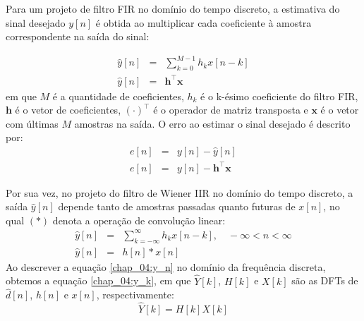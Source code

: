 Para um projeto de filtro FIR no domínio do tempo discreto, a estimativa do
sinal desejado $y[n]$ é obtida ao multiplicar cada coeficiente à amostra correspondente
na saída do sinal: 

\begin{eqnarray}
    \hat{y}[n] &=& \sum_{k=0}^{M-1}h_k x[n-k]\\
    \hat{y}[n] &=& \textbf{h}^\top \textbf{x}
    \end{eqnarray}
em que $M$ é a quantidade de coeficientes, $h_k$ é o k-ésimo coeficiente do
filtro FIR, $\textbf{h}$ é o vetor de coeficientes, $(\cdot) ^\top$ é o operador
de matriz transposta e $\mathbf{x}$ é o vetor com últimas $M$ amostras na saída.
O erro ao estimar o sinal desejado é descrito por:
\begin{eqnarray}
  \label{chap_04:error}  e[n] &=& y[n] - \hat{y}[n]\\
    e[n] &=& y[n] - \textbf{h}^\top \textbf{x}
\end{eqnarray}


Por sua vez, no projeto do filtro de Wiener IIR no domínio do tempo discreto, a
saída $\hat{y}[n]$ depende tanto de amostras passadas quanto futuras de $x[n]$,
no qual $(*)$ denota a operação de convolução linear:
\begin{eqnarray}
    \hat{y}[n] &=& \sum_{k=-\infty}^{\infty}h_k x[n-k], \quad -\infty < n < \infty\\
    \label{chap_04:y_n}\hat{y}[n] &=& h[n] \ast x[n]
\end{eqnarray}
Ao descrever a equação \ref{chap_04:y_n} no domínio da frequência discreta,
obtemos a equação \ref{chap_04:y_k}, em que $\hat{Y}[k]$, $H[k]$ e
$X[k]$ são as DFTs de $\hat{d}[n]$, $h[n]$ e $x[n]$, respectivamente:
\begin{equation} \label{chap_04:y_k}
    \hat{Y}[k] = H[k] X[k]
\end{equation}

